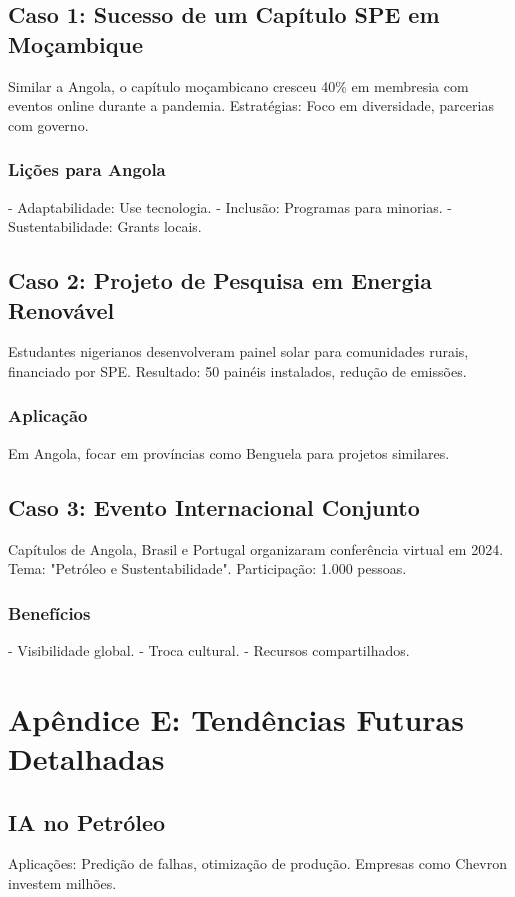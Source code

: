 \documentclass[12pt]{article}
\begin{document}
\subsection{Caso 1: Sucesso de um Capítulo SPE em Moçambique}
Similar a Angola, o capítulo moçambicano cresceu 40\% em membresia com eventos online durante a pandemia. Estratégias: Foco em diversidade, parcerias com governo.

\subsubsection{Lições para Angola}
- Adaptabilidade: Use tecnologia.
- Inclusão: Programas para minorias.
- Sustentabilidade: Grants locais.

\subsection{Caso 2: Projeto de Pesquisa em Energia Renovável}
Estudantes nigerianos desenvolveram painel solar para comunidades rurais, financiado por SPE. Resultado: 50 painéis instalados, redução de emissões.

\subsubsection{Aplicação}
Em Angola, focar em províncias como Benguela para projetos similares.

\subsection{Caso 3: Evento Internacional Conjunto}
Capítulos de Angola, Brasil e Portugal organizaram conferência virtual em 2024. Tema: "Petróleo e Sustentabilidade". Participação: 1.000 pessoas.

\subsubsection{Benefícios}
- Visibilidade global.
- Troca cultural.
- Recursos compartilhados.

\section{Apêndice E: Tendências Futuras Detalhadas}

\subsection{IA no Petróleo}
Aplicações: Predição de falhas, otimização de produção. Empresas como Chevron investem milhões.
\end{document}
